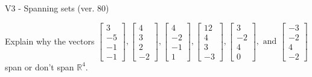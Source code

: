 \begin{exercise}
  \begin{exerciseTitle}V3 - Spanning sets (ver. 80)\end{exerciseTitle}
  \begin{exerciseStatement}
    Explain why the vectors \(\left[\begin{array}{r}
3 \\
-5 \\
-1 \\
-1
\end{array}\right] , \left[\begin{array}{r}
4 \\
3 \\
2 \\
-2
\end{array}\right] , \left[\begin{array}{r}
4 \\
-2 \\
-1 \\
1
\end{array}\right] , \left[\begin{array}{r}
12 \\
4 \\
3 \\
-3
\end{array}\right] , \left[\begin{array}{r}
3 \\
-2 \\
4 \\
0
\end{array}\right] , \text{ and } \left[\begin{array}{r}
-3 \\
-2 \\
4 \\
-2
\end{array}\right]\) span or don't span \(\mathbb{R}^4\). 
	



\end{exerciseStatement}
\end{exercise}
